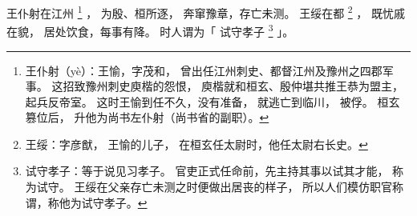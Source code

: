 
\switchcolumn*[\section{}]

王仆射在江州%
\footnote{%
    王仆射（yè）：王愉，字茂和，
                  曾出任江州刺史、都督江州及豫州之四郡军事。
                  这招致豫州刺史庾楷的怨恨，
                  庾楷就和桓玄、殷仲堪共推王恭为盟主，起兵反帝室。
                  这时王愉到任不久，没有准备，
                  就逃亡到临川，
                  被俘。
                  桓玄篡位后，
                  升他为尚书左仆射（尚书省的副职）。
}%
，
为殷、桓所逐，
奔窜豫章，存亡未测。
王绥在都%
\footnote{%
    王绥：字彦猷，
          王愉的儿子，
          在桓玄任太尉时，他任太尉右长史。
}%
，
既忧戚在貌，
居处饮食，每事有降。
时人谓为「
    试守孝子%
    \footnote{%
        试守孝子：等于说见习孝子。
                  官吏正式任命前，先主持其事以试其才能，
                  称为试守。
                  王绥在父亲存亡未测之时便做出居丧的样子，
                  所以人们模仿职官称谓，称他为试守孝子。
    }%
」。

\switchcolumn



